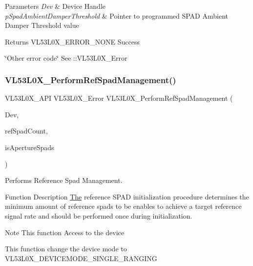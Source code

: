 \begin{DoxyParams}{Parameters}
{\em Dev} & Device Handle \\
\hline
{\em p\+Spad\+Ambient\+Damper\+Threshold} & Pointer to programmed S\+P\+AD Ambient Damper Threshold value \\
\hline
\end{DoxyParams}
\begin{DoxyReturn}{Returns}
V\+L53\+L0\+X\+\_\+\+E\+R\+R\+O\+R\+\_\+\+N\+O\+NE Success 

\char`\"{}\+Other error code\char`\"{} See \+::\+V\+L53\+L0\+X\+\_\+\+Error 
\end{DoxyReturn}
\mbox{\label{group__VL53L0X__SPADfunctions__group_ga70e6eb20975784b72296874674a57bbb}} 
\subsubsection{\texorpdfstring{V\+L53\+L0\+X\+\_\+\+Perform\+Ref\+Spad\+Management()}{VL53L0X\_PerformRefSpadManagement()}}
{\footnotesize\ttfamily V\+L53\+L0\+X\+\_\+\+A\+PI V\+L53\+L0\+X\+\_\+\+Error V\+L53\+L0\+X\+\_\+\+Perform\+Ref\+Spad\+Management (\begin{DoxyParamCaption}\item[{\hyperlink{group__VL53L0X__platform__group_ga2d6405308b1dd524b462f1b8fb97d167}{V\+L53\+L0\+X\+\_\+\+D\+EV}}]{Dev,  }\item[{\hyperlink{vl53l0x__types_8h_a435d1572bf3f880d55459d9805097f62}{uint32\+\_\+t} $\ast$}]{ref\+Spad\+Count,  }\item[{\hyperlink{vl53l0x__types_8h_aba7bc1797add20fe3efdf37ced1182c5}{uint8\+\_\+t} $\ast$}]{is\+Aperture\+Spads }\end{DoxyParamCaption})}



Performs Reference Spad Management. 

\begin{DoxyParagraph}{Function Description}
\hyperlink{structThe}{The} reference S\+P\+AD initialization procedure determines the minimum amount of reference spads to be enables to achieve a target reference signal rate and should be performed once during initialization.
\end{DoxyParagraph}
\begin{DoxyNote}{Note}
This function Access to the device

This function change the device mode to V\+L53\+L0\+X\+\_\+\+D\+E\+V\+I\+C\+E\+M\+O\+D\+E\+\_\+\+S\+I\+N\+G\+L\+E\+\_\+\+R\+A\+N\+G\+I\+NG
\end{DoxyNote}

